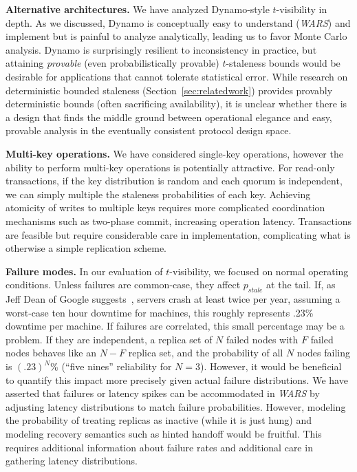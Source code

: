 \documentclass{vldb}
\begin{document}
\textbf{Alternative architectures.} We have analyzed Dynamo-style
$t$-visibility in depth.  As we discussed, Dynamo is conceptually easy
to understand (\textit{WARS}) and implement but is painful to analyze
analytically, leading us to favor Monte Carlo analysis.  Dynamo is
surprisingly resilient to inconsistency in practice, but attaining
\textit{provable} (even probabilistically provable) $t$-staleness
bounds would be desirable for applications that cannot tolerate
statistical error.  While research on deterministic bounded staleness
(Section~\ref{sec:relatedwork}) provides provably deterministic bounds
(often sacrificing availability), it is unclear whether there is a
design that finds the middle ground between operational elegance and
easy, provable analysis in the eventually consistent protocol design
space.

\textbf{Multi-key operations.} We have considered single-key
operations, however the ability to perform multi-key operations is
potentially attractive.  For read-only transactions, if the key
distribution is random and each quorum is independent, we can simply
multiple the staleness probabilities of each key.  Achieving atomicity
of writes to multiple keys requires more complicated coordination
mechanisms such as two-phase commit, increasing operation latency.
Transactions are feasible but require considerable care in
implementation, complicating what is otherwise a simple replication
scheme.

\textbf{Failure modes.} In our evaluation of $t$-visibility, we
focused on normal operating conditions. Unless failures are
common-case, they affect $p_{stale}$ at the tail.  If, as Jeff Dean of
Google suggests~\cite{dean-keynote}, servers crash at least twice per
year, assuming a worst-case ten hour downtime for machines, this
roughly represents .23\% downtime per machine.  If failures are
correlated, this small percentage may be a problem.  If they are
independent, a replica set of $N$ failed nodes with $F$ failed nodes
behaves like an $N-F$ replica set, and the probability of all $N$
nodes failing is $(.23)^N$\% (``five nines'' reliability for
$N$$=$$3$).  However, it would be beneficial to quantify this impact
more precisely given actual failure distributions.  We have asserted
that failures or latency spikes can be accommodated in \textit{WARS}
by adjusting latency distributions to match failure probabilities.
However, modeling the probability of treating replicas as inactive
(while it is just hung) and modeling recovery semantics such as hinted
handoff would be fruitful.  This requires additional information about
failure rates and additional care in gathering latency distributions.
\end{document}
